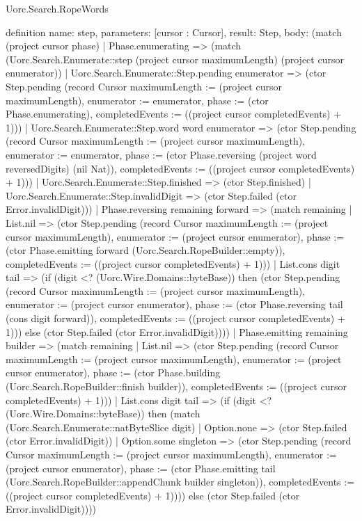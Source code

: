 \begin{lexlean}{Uorc.Search.RopeWords}
\begin{semanticmodule}
definition{
  name: step,
  parameters: [cursor : Cursor],
  result: Step,
  body: (match (project cursor phase)
    | Phase.enumerating => (match (Uorc.Search.Enumerate::step (project cursor maximumLength) (project cursor enumerator))
      | Uorc.Search.Enumerate::Step.pending enumerator => (ctor Step.pending (record Cursor {maximumLength := (project cursor maximumLength), enumerator := enumerator, phase := (ctor Phase.enumerating), completedEvents := ((project cursor completedEvents) + 1)}))
      | Uorc.Search.Enumerate::Step.word word enumerator => (ctor Step.pending (record Cursor {maximumLength := (project cursor maximumLength), enumerator := enumerator, phase := (ctor Phase.reversing (project word reversedDigits) (nil Nat)), completedEvents := ((project cursor completedEvents) + 1)}))
      | Uorc.Search.Enumerate::Step.finished => (ctor Step.finished)
      | Uorc.Search.Enumerate::Step.invalidDigit => (ctor Step.failed (ctor Error.invalidDigit)))
    | Phase.reversing remaining forward => (match remaining
      | List.nil => (ctor Step.pending (record Cursor {maximumLength := (project cursor maximumLength), enumerator := (project cursor enumerator), phase := (ctor Phase.emitting forward (Uorc.Search.RopeBuilder::empty)), completedEvents := ((project cursor completedEvents) + 1)}))
      | List.cons digit tail => (if (digit <? (Uorc.Wire.Domains::byteBase)) then (ctor Step.pending (record Cursor {maximumLength := (project cursor maximumLength), enumerator := (project cursor enumerator), phase := (ctor Phase.reversing tail (cons digit forward)), completedEvents := ((project cursor completedEvents) + 1)})) else (ctor Step.failed (ctor Error.invalidDigit))))
    | Phase.emitting remaining builder => (match remaining
      | List.nil => (ctor Step.pending (record Cursor {maximumLength := (project cursor maximumLength), enumerator := (project cursor enumerator), phase := (ctor Phase.building (Uorc.Search.RopeBuilder::finish builder)), completedEvents := ((project cursor completedEvents) + 1)}))
      | List.cons digit tail => (if (digit <? (Uorc.Wire.Domains::byteBase)) then (match (Uorc.Search.Enumerate::natByteSlice digit)
        | Option.none => (ctor Step.failed (ctor Error.invalidDigit))
        | Option.some singleton => (ctor Step.pending (record Cursor {maximumLength := (project cursor maximumLength), enumerator := (project cursor enumerator), phase := (ctor Phase.emitting tail (Uorc.Search.RopeBuilder::appendChunk builder singleton)), completedEvents := ((project cursor completedEvents) + 1)}))) else (ctor Step.failed (ctor Error.invalidDigit))))
}
\end{semanticmodule}
\end{lexlean}
